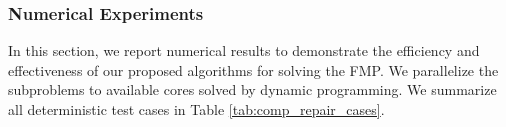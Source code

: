 \documentclass[../main]{subfiles}
\begin{document}









\subsubsection{Numerical Experiments}\label{sec.fmp:numerical-experiments}

In this section, we report numerical results to
demonstrate the efficiency and effectiveness of our proposed algorithms
for solving the FMP. We parallelize the
subproblems to available cores solved by dynamic programming.
We summarize all deterministic test cases in Table \ref{tab:comp_repair_cases}.
\end{document}

